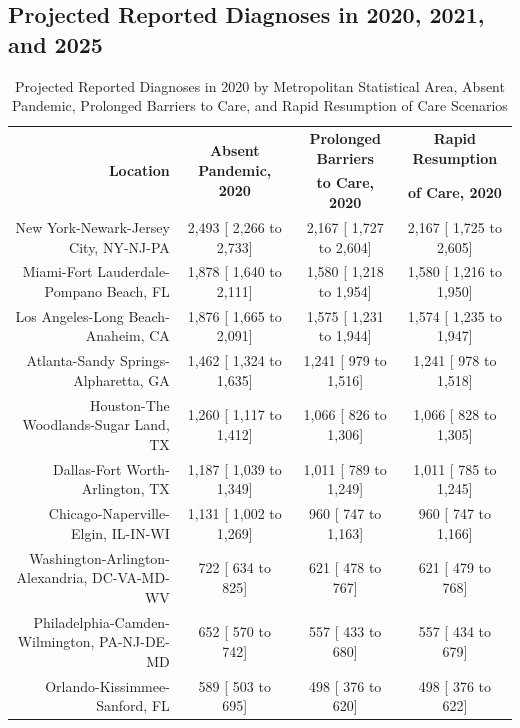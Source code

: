 \documentclass{article}
\begin{document}

\subsection{Projected Reported Diagnoses in 2020, 2021, and 2025}

\begin{table}[H]
	\caption{Projected Reported Diagnoses in 2020 by Metropolitan Statistical Area, Absent Pandemic, Prolonged Barriers to Care, and Rapid Resumption of Care Scenarios}
	\footnotesize
	\begin{tabular}{|r|c|c|c|}
		\hline
		\multirow{2}{*}{\textbf{Location}} & \multirow{2}{*}{\textbf{Absent Pandemic, 2020}} & \textbf{Prolonged Barriers} & \textbf{Rapid Resumption}\\
		&  & \textbf{to Care, 2020} & \textbf{of Care, 2020}\\
		\hline\hline
		New York-Newark-Jersey City, NY-NJ-PA &  2,493 [ 2,266 to  2,733] &  2,167 [ 1,727 to  2,604] &  2,167 [ 1,725 to  2,605]\\
		Miami-Fort Lauderdale-Pompano Beach, FL &  1,878 [ 1,640 to  2,111] &  1,580 [ 1,218 to  1,954] &  1,580 [ 1,216 to  1,950]\\
		Los Angeles-Long Beach-Anaheim, CA &  1,876 [ 1,665 to  2,091] &  1,575 [ 1,231 to  1,944] &  1,574 [ 1,235 to  1,947]\\
		Atlanta-Sandy Springs-Alpharetta, GA &  1,462 [ 1,324 to  1,635] &  1,241 [   979 to  1,516] &  1,241 [   978 to  1,518]\\
		Houston-The Woodlands-Sugar Land, TX &  1,260 [ 1,117 to  1,412] &  1,066 [   826 to  1,306] &  1,066 [   828 to  1,305]\\
		Dallas-Fort Worth-Arlington, TX &  1,187 [ 1,039 to  1,349] &  1,011 [   789 to  1,249] &  1,011 [   785 to  1,245]\\
		Chicago-Naperville-Elgin, IL-IN-WI &  1,131 [ 1,002 to  1,269] &    960 [   747 to  1,163] &    960 [   747 to  1,166]\\
		Washington-Arlington-Alexandria, DC-VA-MD-WV &    722 [   634 to    825] &    621 [   478 to    767] &    621 [   479 to    768]\\
		Philadelphia-Camden-Wilmington, PA-NJ-DE-MD &    652 [   570 to    742] &    557 [   433 to    680] &    557 [   434 to    679]\\
		Orlando-Kissimmee-Sanford, FL &    589 [   503 to    695] &    498 [   376 to    620] &    498 [   376 to    622]\\

\end{tabular}
\end{table}
\end{document}
